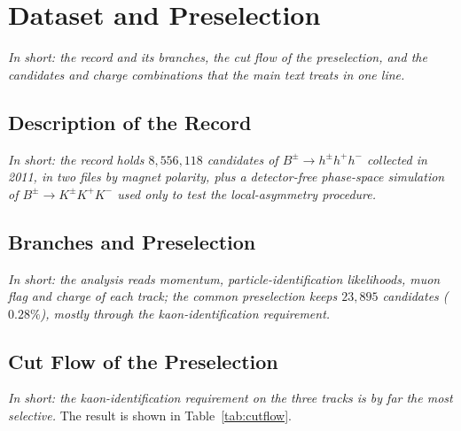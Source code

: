 \appendix
\makeatletter\renewcommand\subsection{}\makeatother
\makeatletter\renewcommand{}\makeatother

\section{Dataset and Preselection}
\label{app:ext_data}
\emph{In short: the record and its branches, the cut flow of the preselection, and the candidates and charge combinations that the main text treats in one line.}
\subsection{Description of the Record}
\emph{In short: the record holds $8{,}556{,}118$ candidates of $B^\pm\to h^\pm h^+h^-$ collected in 2011, in two files by magnet polarity, plus a detector-free phase-space simulation of $B^\pm\to K^\pm K^+K^-$ used only to test the local-asymmetry procedure.}

\subsection{Branches and Preselection}
\emph{In short: the analysis reads momentum, particle-identification likelihoods, muon flag and charge of each track; the common preselection keeps $23{,}895$ candidates ($0.28\%$), mostly through the kaon-identification requirement.}

\subsection{Cut Flow of the Preselection}
\label{app:cutflow}
\emph{In short: the kaon-identification requirement on the three tracks is by far the most selective.}
The result is shown in Table~\ref{tab:cutflow}.

